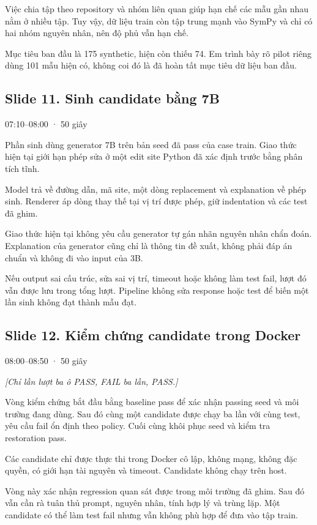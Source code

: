 \documentclass[12pt,a4paper]{article}
\begin{document}
Việc chia tập theo repository và nhóm liên quan giúp hạn chế các mẫu gần nhau nằm ở nhiều tập. Tuy vậy, dữ liệu train còn tập trung mạnh vào SymPy và chỉ có hai nhóm nguyên nhân, nên độ phủ vẫn hạn chế.

Mục tiêu ban đầu là 175 synthetic, hiện còn thiếu 74. Em trình bày rõ pilot riêng dùng 101 mẫu hiện có, không coi đó là đã hoàn tất mục tiêu dữ liệu ban đầu.

\clearpage
\subsection*{Slide 11. Sinh candidate bằng 7B}
{\small\color{gray}07:10–08:00 · 50 giây}\par
Phần sinh dùng generator 7B trên bản seed đã pass của case train. Giao thức hiện tại giới hạn phép sửa ở một edit site Python đã xác định trước bằng phân tích tĩnh.

Model trả về đường dẫn, mã site, một dòng replacement và explanation về phép sinh. Renderer áp dòng thay thế tại vị trí được phép, giữ indentation và các test đã ghim.

Giao thức hiện tại không yêu cầu generator tự gán nhãn nguyên nhân chẩn đoán. Explanation của generator cũng chỉ là thông tin đề xuất, không phải đáp án chuẩn và không đi vào input của 3B.

Nếu output sai cấu trúc, sửa sai vị trí, timeout hoặc không làm test fail, lượt đó vẫn được lưu trong tổng lượt. Pipeline không sửa response hoặc test để biến một lần sinh không đạt thành mẫu đạt.

\subsection*{Slide 12. Kiểm chứng candidate trong Docker}
{\small\color{gray}08:00–08:50 · 50 giây}\par
{\itshape\color{gray}[Chỉ lần lượt ba ô PASS, FAIL ba lần, PASS.]}\par
Vòng kiểm chứng bắt đầu bằng baseline pass để xác nhận passing seed và môi trường đang dùng. Sau đó cùng một candidate được chạy ba lần với cùng test, yêu cầu fail ổn định theo policy. Cuối cùng khôi phục seed và kiểm tra restoration pass.

Các candidate chỉ được thực thi trong Docker cô lập, không mạng, không đặc quyền, có giới hạn tài nguyên và timeout. Candidate không chạy trên host.

Vòng này xác nhận regression quan sát được trong môi trường đã ghim. Sau đó vẫn cần rà tuân thủ prompt, nguyên nhân, tính hợp lý và trùng lặp. Một candidate có thể làm test fail nhưng vẫn không phù hợp để đưa vào tập train.
\end{document}
